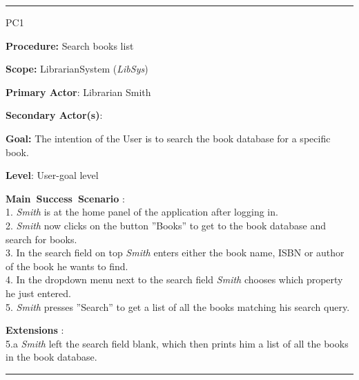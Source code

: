\vspace{0.5cm}
\hrule
\begin{lyxlist}{PC1}
\small{
\item [\textbf{Procedure:}] Search books list
\item [\textbf{Scope:}] LibrarianSystem (\emph{LibSys})
\item [\textbf{Primary Actor}:] Librarian Smith
\item [\textbf{Secondary Actor(s)}:] 
\item [\textbf{Goal:}] The intention of the User is to search the book database
for a specific book.
\item [\textbf{Level}:] User-goal level
\item [\textbf{Main~Success~Scenario}]:\\
1. \emph{Smith} is at the home panel of the application after logging in.\\
2. \emph{Smith} now clicks on the button ''Books'' to get to the book database
and search for books.\\
3. In the search field on top \emph{Smith} enters either the book name, ISBN or
author of the book he wants to find.\\
4. In the dropdown menu next to the search field \emph{Smith} chooses which
property he just entered.\\
5. \emph{Smith} presses ''Search'' to get a list of all the books matching his
search query.\\


\item [\textbf{Extensions}]:\\
5.a \emph{Smith} left the search field blank, which then prints him a list of
all the books in the book database.\\
}


\end{lyxlist}
\hrule

